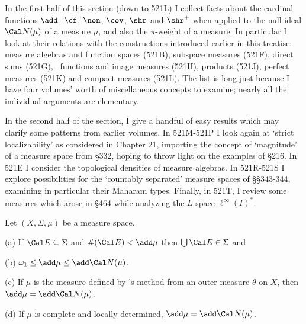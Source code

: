 
\def\chaptername{Cardinal functions of measure theory}
\def\sectionname{Basic theory}

\def\magnitude{\mathop{\text{mag}}}


In the first half of this section (down to 521L) I collect facts
about the cardinal
functions $\add$, $\cf$, $\non$, $\cov$, $\shr$ and $\shr^+$ when applied
to the null ideal $\Cal N(\mu)$ of a measure $\mu$, and also the
$\pi$-weight of a measure.
In particular I look at their relations with the
constructions introduced earlier in this treatise:
measure algebras and function
spaces (521B), subspace measures (521F), direct sums (521G), \imp\
functions and image measures (521H), products (521J), perfect measures
(521K) and compact measures (521L).   The list is long just because I
have four volumes' worth of miscellaneous concepts to examine;  nearly all
the individual arguments are elementary.

In the second half of the section, I give
a handful of easy results which may clarify some
patterns from earlier volumes.   In 521M-521P %
I look again at `strict localizability' as considered in Chapter 21,
importing the concept of `magnitude' of a measure space from \S332,
hoping to throw light on the examples of \S216.
In 521E I consider the topological densities of measure algebras.
In 521R-521S I
explore possibilities for the `countably separated' measure spaces of
\S\S343-344, examining in particular their Maharam types.   Finally,
in 521T, I review some measures which arose in \S464 while analyzing the
$L$-space $\ell^{\infty}(I)^*$.

 Let $(X,\Sigma,\mu)$ be a measure space.

(a) If $\Cal E\subseteq\Sigma$ and $\#(\Cal E)<\add\mu$ then
$\bigcup\Cal E\in\Sigma$ and


(b) $\omega_1\le\add\mu\le\add\Cal N(\mu)$.

(c) If $\mu$ is the measure defined by \Caratheodory's method from
an outer measure $\theta$ on $X$, then $\add\mu=\add\Cal N(\mu)$.

(d) If $\mu$ is complete and locally determined,
$\add\mu=\add\Cal N(\mu)$.


